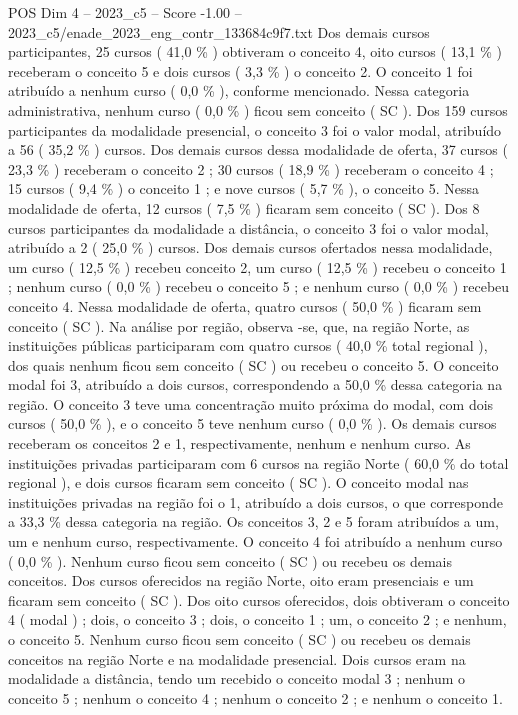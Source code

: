 \begin{textsample}{POS Dim 4 – 2023\_c5 – Score -1.00 – 2023\_c5/enade\_2023\_eng\_contr\_133684c9f7.txt}
Dos demais cursos participantes, 25 cursos ( 41,0 \% ) obtiveram o conceito 4, oito cursos ( 13,1 \% ) receberam o conceito 5 e dois cursos ( 3,3 \% ) o conceito 2.
O conceito 1 foi atribuído a nenhum curso ( 0,0 \% ), conforme mencionado.
Nessa categoria administrativa, nenhum curso ( 0,0 \% ) ficou sem conceito ( SC ).
Dos 159 cursos participantes da modalidade presencial, o conceito 3 foi o valor modal, atribuído a 56 ( 35,2 \% ) cursos.
Dos demais cursos dessa modalidade de oferta, 37 cursos ( 23,3 \% ) receberam o conceito 2 ; 30 cursos ( 18,9 \% ) receberam o conceito 4 ; 15 cursos ( 9,4 \% ) o conceito 1 ; e nove cursos ( 5,7 \% ), o conceito 5.
Nessa modalidade de oferta, 12 cursos ( 7,5 \% ) ficaram sem conceito ( SC ).
Dos 8 cursos participantes da modalidade a distância, o conceito 3 foi o valor modal, atribuído a 2 ( 25,0 \% ) cursos.
Dos demais cursos ofertados nessa modalidade, um curso ( 12,5 \% ) recebeu conceito 2, um curso ( 12,5 \% ) recebeu o conceito 1 ; nenhum curso ( 0,0 \% ) recebeu o conceito 5 ; e nenhum curso ( 0,0 \% ) recebeu conceito 4.
Nessa modalidade de oferta, quatro cursos ( 50,0 \% ) ficaram sem conceito ( SC ).
Na análise por região, observa -se, que, na região Norte, as instituições públicas participaram com quatro cursos ( 40,0 \% total regional ), dos quais nenhum ficou sem conceito ( SC ) ou recebeu o conceito 5.
O conceito modal foi 3, atribuído a dois cursos, correspondendo a 50,0 \% dessa categoria na região.
O conceito 3 teve uma concentração muito próxima do modal, com dois cursos ( 50,0 \% ), e o conceito 5 teve nenhum curso ( 0,0 \% ).
Os demais cursos receberam os conceitos 2 e 1, respectivamente, nenhum e nenhum curso.
As instituições privadas participaram com 6 cursos na região Norte ( 60,0 \% do total regional ), e dois cursos ficaram sem conceito ( SC ).
O conceito modal nas instituições privadas na região foi o 1, atribuído a dois cursos, o que corresponde a 33,3 \% dessa categoria na região.
Os conceitos 3, 2 e 5 foram atribuídos a um, um e nenhum curso, respectivamente.
O conceito 4 foi atribuído a nenhum curso ( 0,0 \% ).
Nenhum curso ficou sem conceito ( SC ) ou recebeu os demais conceitos.
Dos cursos oferecidos na região Norte, oito eram presenciais e um ficaram sem conceito ( SC ).
Dos oito cursos oferecidos, dois obtiveram o conceito 4 ( modal ) ; dois, o conceito 3 ; dois, o conceito 1 ; um, o conceito 2 ; e nenhum, o conceito 5.
Nenhum curso ficou sem conceito ( SC ) ou recebeu os demais conceitos na região Norte e na modalidade presencial.
Dois cursos eram na modalidade a distância, tendo um recebido o conceito modal 3 ; nenhum o conceito 5 ; nenhum o conceito 4 ; nenhum o conceito 2 ; e nenhum o conceito 1.

\end{textsample}

